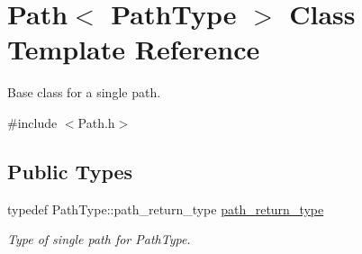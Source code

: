 \hypertarget{class_path}{}\section{Path$<$ Path\+Type $>$ Class Template Reference}
\label{class_path}


Base class for a single path.  




{\ttfamily \#include $<$Path.\+h$>$}

\subsection*{Public Types}
\begin{DoxyCompactItemize}
\item 
typedef Path\+Type\+::path\+\_\+return\+\_\+type \hyperlink{class_path_a3b1c34a87f7867f6fed2e0a33f801e7d}{path\+\_\+return\+\_\+type}
\begin{DoxyCompactList}\small\item\em Type of single path for Path\+Type. \end{DoxyCompactList}\end{DoxyCompactItemize}
